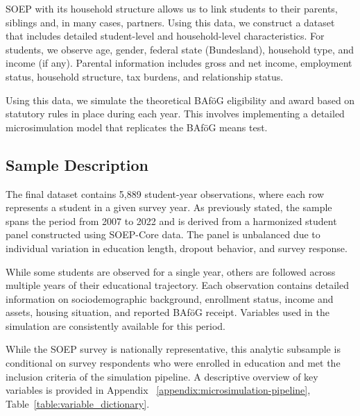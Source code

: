 SOEP with its household structure allows us to link students to their parents, siblings and, in many cases, partners.
Using this data, we construct a dataset that includes detailed student-level and household-level characteristics. 
For students, we observe age, gender, federal state (Bundesland), household type, and income (if any). 
Parental information includes gross and net income, employment status, household structure, tax burdens, and relationship status. 

Using this data, we simulate the theoretical BAföG eligibility and award based on statutory rules in place during each year. 
This involves implementing a detailed microsimulation model that replicates the BAföG means test.

\subsection{Sample Description}
The final dataset contains 5,889 student-year observations, where each row represents a student in a given survey year. As previously stated, the sample spans the period from 2007 to 2022 and is derived from a harmonized student panel constructed using SOEP-Core data. The panel is unbalanced due to individual variation in education length, dropout behavior, and survey response. 

While some students are observed for a single year, others are followed across multiple years of their educational trajectory. Each observation contains detailed information on sociodemographic background, enrollment status, income and assets, housing situation, and reported BAföG receipt. Variables used in the simulation are consistently available for this period.


While the SOEP survey is nationally representative, this analytic subsample is conditional on survey respondents who were enrolled in education and met the inclusion criteria of the simulation pipeline. 
A descriptive overview of key variables is provided in Appendix ~\ref{appendix:microsimulation-pipeline}, Table~\ref{table:variable_dictionary}.



